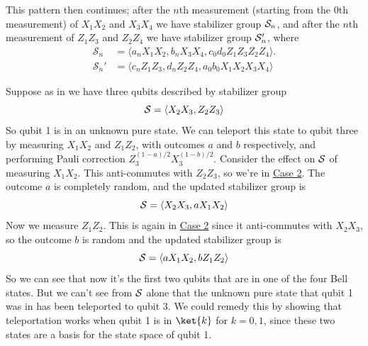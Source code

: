 \begin{example}
    This pattern then continues; after the $n$th measurement (starting from the $0$th measurement) of $X_1 X_2$ and $X_3 X_4$ we have stabilizer group $\mathcal{S}_n$, and after the $n$th measurement of $Z_1 Z_3$ and $Z_2 Z_4$ we have stabilizer group $\mathcal{S}_n'$, where
    \begin{equation}
        \begin{aligned}
            \mathcal{S}_n &= \langle a_n X_1 X_2, b_n X_3 X_4, c_0 d_0 Z_1 Z_3 Z_2 Z_4 \rangle. \\
            \mathcal{S}_n' &= \langle c_n Z_1 Z_3, d_n Z_2 Z_4, a_0 b_0 X_1 X_2 X_3 X_4 \rangle
        \end{aligned}
    \end{equation}
\end{example}

\begin{example}\label{ex:teleportation_stabilizer_group_updates}
    Suppose as in  we have three qubits described by stabilizer group
    \begin{equation}
        \mathcal{S} = \langle X_2 X_3, Z_2 Z_3 \rangle
    \end{equation}
    So qubit 1 is in an unknown pure state.
    We can teleport this state to qubit three by measuring $X_1 X_2$ and $Z_1 Z_2$, with outcomes $a$ and $b$ respectively, and performing Pauli correction $Z_3^{(1 - a)/2} X_3^{(1 - b)/2}$.
    Consider the effect on $\mathcal{S}$ of measuring $X_1 X_2$.
    This anti-commutes with $Z_2 Z_3$, so we're in \hyperref[thm:stabilizer_group_update_measurement:case2]{Case 2}.
    The outcome $a$ is completely random, and the updated stabilizer group is
    \begin{equation}
        \mathcal{S} = \langle X_2 X_3, a X_1 X_2 \rangle
    \end{equation}
    Now we measure $Z_1 Z_2$.
    This is again in \hyperref[thm:stabilizer_group_update_measurement:case2]{Case 2} since it anti-commutes with $X_2 X_3$, so the outcome $b$ is random and the updated stabilizer group is
    \begin{equation}
        \mathcal{S} = \langle a X_1 X_2, b Z_1 Z_2 \rangle
    \end{equation}
    So we can see that now it's the first two qubits that are in one of the four Bell states.
    But we can't see from $\mathcal{S}$ alone that the unknown pure state that qubit 1 was in has been teleported to qubit 3.
    We could remedy this by showing that teleportation works when qubit 1 is in $\ket{k}$ for $k = 0 , 1$, since these two states are a basis for the state space of qubit 1.

\end{example}
